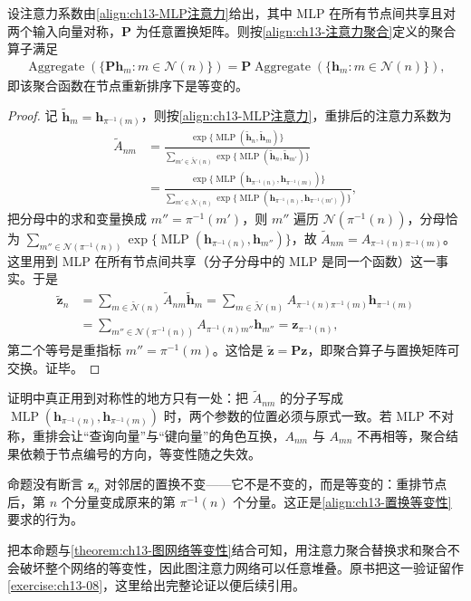 \documentclass[../../main.tex]{subfiles}
\begin{document}
\begin{proposition}[图注意力聚合的置换等变性]\label{proposition:ch13-图注意力等变性}
设注意力系数由\eqref{align:ch13-MLP注意力}给出，其中 MLP 在所有节点间共享且对两个输入向量对称，$\bm{P}$ 为任意置换矩阵。则按\eqref{align:ch13-注意力聚合}定义的聚合算子满足
\begin{align*}
\operatorname{Aggregate}\left(\{\bm{P}\bm{h}_m:m\in\mathcal{N}(n)\}\right)=\bm{P}\operatorname{Aggregate}\left(\{\bm{h}_m:m\in\mathcal{N}(n)\}\right),
\end{align*}
即该聚合函数在节点重新排序下是等变的。
\end{proposition}

\begin{proof}
记 $\widetilde{\bm{h}}_m=\bm{h}_{\pi^{-1}(m)}$，则按\eqref{align:ch13-MLP注意力}，重排后的注意力系数为
\begin{align*}
\widetilde{A}_{nm}&=\frac{\exp\{\operatorname{MLP}(\widetilde{\bm{h}}_n,\widetilde{\bm{h}}_m)\}}{\sum_{m'\in\widetilde{\mathcal{N}}(n)}\exp\{\operatorname{MLP}(\widetilde{\bm{h}}_n,\widetilde{\bm{h}}_{m'})\}}\\
&=\frac{\exp\{\operatorname{MLP}(\bm{h}_{\pi^{-1}(n)},\bm{h}_{\pi^{-1}(m)})\}}{\sum_{m'\in\widetilde{\mathcal{N}}(n)}\exp\{\operatorname{MLP}(\bm{h}_{\pi^{-1}(n)},\bm{h}_{\pi^{-1}(m')})\}},
\end{align*}
把分母中的求和变量换成 $m''=\pi^{-1}(m')$，则 $m''$ 遍历 $\mathcal{N}(\pi^{-1}(n))$，分母恰为 $\sum_{m''\in\mathcal{N}(\pi^{-1}(n))}\exp\{\operatorname{MLP}(\bm{h}_{\pi^{-1}(n)},\bm{h}_{m''})\}$，故 $\widetilde{A}_{nm}=A_{\pi^{-1}(n)\pi^{-1}(m)}$。这里用到 MLP 在所有节点间共享（分子分母中的 MLP 是同一个函数）这一事实。于是
\begin{align*}
\widetilde{\bm{z}}_n&=\sum_{m\in\widetilde{\mathcal{N}}(n)}\widetilde{A}_{nm}\widetilde{\bm{h}}_m=\sum_{m\in\widetilde{\mathcal{N}}(n)}A_{\pi^{-1}(n)\pi^{-1}(m)}\bm{h}_{\pi^{-1}(m)}\\
&=\sum_{m''\in\mathcal{N}(\pi^{-1}(n))}A_{\pi^{-1}(n)m''}\bm{h}_{m''}=\bm{z}_{\pi^{-1}(n)},
\end{align*}
第二个等号是重指标 $m''=\pi^{-1}(m)$。这恰是 $\widetilde{\bm{z}}=\bm{P}\bm{z}$，即聚合算子与置换矩阵可交换。证毕。
\end{proof}

\begin{remark}
证明中真正用到对称性的地方只有一处：把 $\widetilde{A}_{nm}$ 的分子写成 $\operatorname{MLP}(\bm{h}_{\pi^{-1}(n)},\bm{h}_{\pi^{-1}(m)})$ 时，两个参数的位置必须与原式一致。若 MLP 不对称，重排会让“查询向量”与“键向量”的角色互换，$A_{nm}$ 与 $A_{mn}$ 不再相等，聚合结果依赖于节点编号的方向，等变性随之失效。\par
命题没有断言 $\bm{z}_n$ 对邻居的置换不变——它不是不变的，而是等变的：重排节点后，第 $n$ 个分量变成原来的第 $\pi^{-1}(n)$ 个分量。这正是\eqref{align:ch13-置换等变性}要求的行为。\par
把本命题与\cref{theorem:ch13-图网络等变性}结合可知，用注意力聚合替换求和聚合不会破坏整个网络的等变性，因此图注意力网络可以任意堆叠。原书把这一验证留作\cref{exercise:ch13-08}，这里给出完整论证以便后续引用。
\end{remark}
\end{document}
